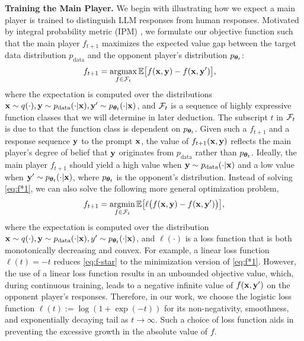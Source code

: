 \documentclass{article}
\begin{document}
\noindent \textbf{Training the Main Player.}
We begin with illustrating how we expect a main player is trained to distinguish LLM responses from human responses.  Motivated by integral probability metric (IPM) \citep{muller1997integral},
we formulate our objective function such that the main player $f_{t+1}$ maximizes the expected value gap between the target data distribution $p_{\mathrm{data}}$ and the opponent player's distribution $p_{\bm{\theta}_t}$: 
\begin{align}
f_{t+1} &= \mathop{\mathrm{argmax}}_{f \in \mathcal{F}_{t}}\mathbb{E}\big[ f(\mathbf{x}, \mathbf{y}) - f(\mathbf{x}, \mathbf{y}') 
\big], \label{eq:f*1}
\end{align}
where the expectation is computed over the distributions $\mathbf{x}\sim q(\cdot), \mathbf{y}\sim p_{\mathrm{data}}(\cdot|\mathbf{x}), \mathbf{y}'\sim p_{\bm{\theta}_t}(\cdot|\mathbf{x})$, and $\mathcal{F}_{t}$ is a sequence of highly expressive function classes that we will determine in later deduction. The subscript $t$ in $\mathcal{F}_{t}$ is due to that the function class is dependent on $p_{\bm{\theta}_t}$. Given such a $f_{t+1}$ and a response sequence $\mathbf{y}$ to the prompt $\mathbf{x}$, the value of $f_{t+1}(\mathbf{x}, \mathbf{y})$ reflects the main player's degree of belief that $\mathbf{y}$ originates from $p_{\mathrm{data}}$ rather than $p_{\bm{\theta}_t}$.  
Ideally, the main player $f_{t+1}$ should yield a high value when $\mathbf{y} \sim p_{\mathrm{data}}(\cdot|\mathbf{x})$ and a low value when $\mathbf{y}' \sim p_{\bm{\theta}_t}( \cdot | \mathbf{x})$, where $p_{\bm{\theta}_t}$ is the opponent's distribution. Instead of solving \eqref{eq:f*1}, we can also solve the following more general optimization problem, 
\begin{equation}
f_{t+1} = \mathop{\mathrm{argmin}}_{f \in \mathcal{F}_{t}}\mathbb{E}\big[ \ell\big(f(\mathbf{x}, \mathbf{y}) - f(\mathbf{x}, \mathbf{y}')\big) 
\big], 
\label{eq:f-star}
\end{equation}
where the expectation is computed over the distribution $\mathbf{x}\sim q(\cdot), \mathbf{y}\sim p_{\mathrm{data}}(\cdot|\mathbf{x}), y'\sim p_{\bm{\theta}_t}(\cdot|\mathbf{x})$, and $\ell(\cdot)$ is a loss function that is both monotonically decreasing and convex. For example, a linear loss function $\ell(t) = - t$ reduces \eqref{eq:f-star} to the minimization version of \eqref{eq:f*1}. 
However, the use of a linear loss function results in an unbounded objective value, which, during continuous training, leads to a negative infinite value of $f(\mathbf{x}, \mathbf{y}')$ on the opponent player's responses. 
Therefore, in our work, we choose the logistic loss function $\ell(t):= \log(1+\exp(-t))$ for its non-negativity, smoothness, and exponentially decaying tail as $t \rightarrow \infty$.
Such a choice of loss function aids in preventing the excessive growth in the absolute value of $f$. 
\end{document}

